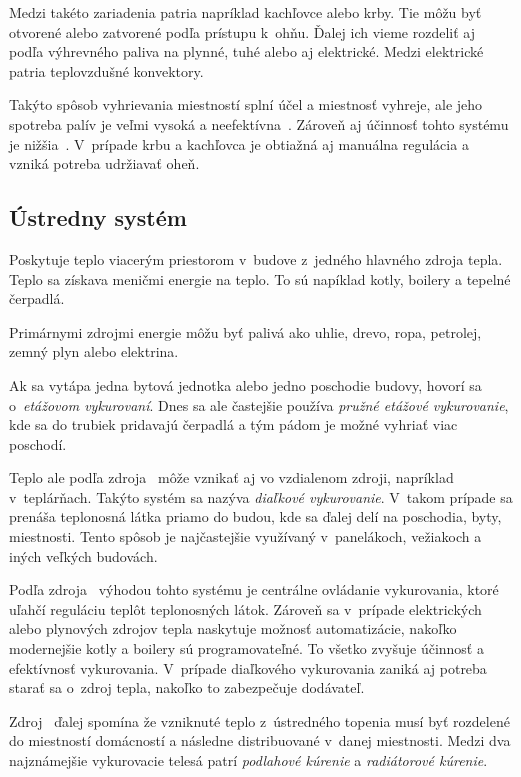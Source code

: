 Medzi takéto zariadenia patria napríklad kachľovce alebo krby. 
Tie môžu byť otvorené alebo zatvorené podľa prístupu k~ohňu. 
Ďalej ich vieme rozdeliť aj podľa výhrevného paliva na plynné, tuhé alebo aj elektrické. 
Medzi elektrické patria teplovzdušné konvektory.~\cite{vstajer2020elektricke}

Takýto spôsob vyhrievania miestností splní účel a miestnosť vyhreje, ale jeho spotreba palív je veľmi vysoká a neefektívna~\cite{pichova2012elektricke}. 
Zároveň aj účinnosť tohto systému je nižšia~\cite{pichova2012elektricke}. 
V~prípade krbu a kachľovca je obtiažná aj manuálna regulácia a vzniká potreba udržiavať oheň.


\subsection{Ústredny systém}\label{central}
Poskytuje teplo viacerým priestorom v~budove z~jedného hlavného zdroja tepla. 
Teplo sa získava meničmi energie na teplo. 
To sú napíklad kotly, boilery a tepelné čerpadlá.~\cite{centralHeating}

Primárnymi zdrojmi energie môžu byť palivá ako uhlie, drevo, ropa, petrolej, zemný plyn alebo elektrina.

Ak sa vytápa jedna bytová jednotka alebo jedno poschodie budovy, hovorí sa o~\emph{etážovom vykurovaní}. 
Dnes sa ale častejšie používa \emph{pružné etážové vykurovanie}, kde sa do trubiek pridavajú čerpadlá a tým pádom je možné vyhriať viac poschodí.~\cite{etaz}

Teplo ale podľa zdroja~\cite{teplarne} môže vznikať aj vo vzdialenom zdroji, napríklad v~teplárňach.
Takýto systém sa nazýva \emph{diaľkové vykurovanie}. 
V~takom prípade sa prenáša teplonosná látka priamo do budou, kde sa ďalej delí na poschodia, byty, miestnosti. 
Tento spôsob je najčastejšie využívaný v~panelákoch, vežiakoch a iných veľkých budovách.

Podľa zdroja~\cite{centralHeatingPlu} výhodou tohto systému je centrálne ovládanie vykurovania, ktoré uľahčí reguláciu teplôt teplonosných látok. 
Zároveň sa v~prípade elektrických alebo plynových zdrojov tepla naskytuje možnosť automatizácie, nakoľko modernejšie kotly a boilery sú programovateľné. 
To všetko zvyšuje účinnosť a efektívnosť vykurovania. 
V~prípade diaľkového vykurovania zaniká aj potreba starať sa o~zdroj tepla, nakoľko to zabezpečuje dodávateľ.

Zdroj~\cite{centralHeatingPlu} ďalej spomína že vzniknuté teplo z~ústredného topenia musí byť rozdelené do miestností domácností a následne distribuované v~danej miestnosti. 
Medzi dva najznámejšie vykurovacie telesá patrí \emph{podlahové kúrenie} a \emph{radiátorové kúrenie}.

